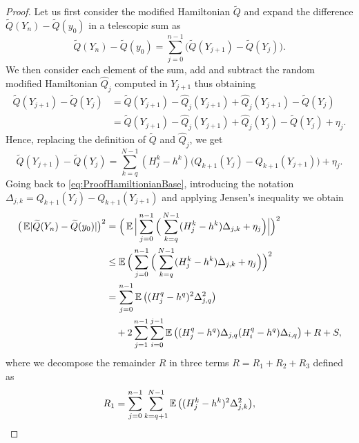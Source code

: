 \documentclass[10pt]{article}
\begin{document}
\begin{proof} Let us first consider the modified Hamiltonian $\tilde Q$ and expand the difference $\tilde Q(Y_n) - \tilde Q(y_0)$ in a telescopic sum as
	\begin{equation}\label{eq:ProofHamiltionianBase}
	\tilde Q(Y_n) - \tilde Q(y_0) = \sum_{j=0}^{n-1} \big(\tilde Q(Y_{j+1}) - \tilde Q(Y_j)\big).
	\end{equation}
	We then consider each element of the sum, add and subtract the random modified Hamiltonian $\hat Q_j$ computed in $Y_{j+1}$ thus obtaining
	\begin{equation}
	\begin{aligned}
	\tilde Q(Y_{j+1}) - \tilde Q(Y_j) &= \tilde Q(Y_{j+1}) - \hat Q_j(Y_{j+1}) + \hat Q_j(Y_{j+1}) - \tilde Q(Y_j) \\
	&= \tilde Q(Y_{j+1}) - \hat Q_j(Y_{j+1}) + \hat Q_j(Y_j) - \tilde Q(Y_j) + \eta_j.
	\end{aligned}
	\end{equation}
	Hence, replacing the definition of $\tilde Q$ and $\hat Q_j$, we get
	\begin{equation}
	\tilde Q(Y_{j+1}) - \tilde Q(Y_j) = \sum_{k=q}^{N-1} (H_j^k - h^k)\big(Q_{k+1}(Y_j) - Q_{k+1}(Y_{j+1})\big) + \eta_j.
	\end{equation}
	Going back to \eqref{eq:ProofHamiltionianBase}, introducing the notation $\Delta_{j,k} = Q_{k+1}(Y_j) - Q_{k+1}(Y_{j+1})$ and applying Jensen's inequality we obtain
	\begin{equation}\label{eq:ProofHamiltonianDecomp}
	\begin{aligned}
	\big(\operatorname{\mathbb{E}} \lvert\widetilde Q(Y_n) - \widetilde Q(y_0)\rvert\big)^2 &= \Big(\operatorname{\mathbb{E}} \Big\lvert\sum_{j=0}^{n-1} \Big(\sum_{k=q}^{N-1} (H_j^k - h^k)\Delta_{j,k} + \eta_j \Big) \Big\rvert\Big)^2 \\
	&\leq \operatorname{\mathbb{E}} \Big(\sum_{j=0}^{n-1} \Big(\sum_{k=q}^{N-1}(H_j^k - h^k)\Delta_{j,k} + \eta_j \Big) \Big)^2 \\
	&= \sum_{j=0}^{n-1}\operatorname{\mathbb{E}}\big((H_j^q - h^q)^2 \Delta_{j,q}^2\big) \\
	&\quad + 2\sum_{j=1}^{n-1}\sum_{i=0}^{j-1} \operatorname{\mathbb{E}}\big((H_j^q - h^q)\Delta_{j,q}(H_i^q - h^q) \Delta_{i,q}\big) + R + S,
	\end{aligned}
	\end{equation}
	where we decompose the remainder $R$ in three terms $R = R_1 + R_2 + R_3$ defined as
	\begin{equation}
	\begin{aligned}
	R_1 &= \sum_{j=0}^{n-1}\sum_{k=q+1}^{N-1} \E\big((H_j^k - h^k)^2 \Delta_{j,k}^2\big), \\

\end{aligned}
\end{equation}
\end{proof}
\end{document}
